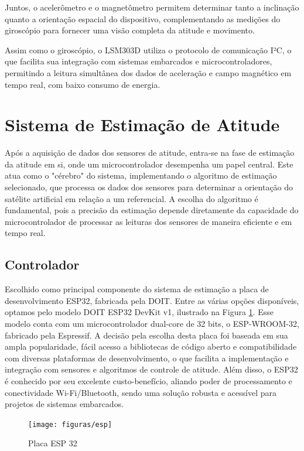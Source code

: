 \documentclass[
	12pt,				%
	openright,			%
	oneside,			%
	a4paper,			%
	english,			%
	brazil				%
	]{abntex2}
\begin{document}
Juntos, o acelerômetro e o magnetômetro permitem determinar tanto a inclinação quanto a orientação espacial do dispositivo, complementando as medições do giroscópio para fornecer uma visão completa da atitude e movimento.

Assim como o giroscópio, o LSM303D utiliza o protocolo de comunicação I²C, o que facilita sua integração com sistemas embarcados e microcontroladores, permitindo a leitura simultânea dos dados de aceleração e campo magnético em tempo real, com baixo consumo de energia.

\section{Sistema de Estimação de Atitude}

Após a aquisição de dados dos sensores de atitude, entra-se na fase de estimação da atitude em si, onde um microcontrolador desempenha um papel central. Este atua como o "cérebro" do sistema, implementando o algoritmo de estimação selecionado, que processa os dados dos sensores para determinar a orientação do satélite artificial em relação a um referencial. A escolha do algoritmo é fundamental, pois a precisão da estimação depende diretamente da capacidade do microcontrolador de processar as leituras dos sensores de maneira eficiente e em tempo real.

\subsection{Controlador}


Escolhido como principal componente do sistema de estimação a placa de desenvolvimento ESP32, fabricada pela DOIT. Entre as várias opções disponíveis, optamos pelo modelo DOIT ESP32 DevKit v1, ilustrado na Figura \ref{fig:esp}. Esse modelo conta com um microcontrolador dual-core de 32 bits, o ESP-WROOM-32, fabricado pela Espressif. A decisão pela escolha desta placa foi baseada em sua ampla popularidade, fácil acesso a bibliotecas de código aberto e compatibilidade com diversas plataformas de desenvolvimento, o que facilita a implementação e integração com sensores e algoritmos de controle de atitude. Além disso, o ESP32 é conhecido por seu excelente custo-benefício, aliando poder de processamento e conectividade Wi-Fi/Bluetooth, sendo uma solução robusta e acessível para projetos de sistemas embarcados.

\begin{figure}[h]
	\centering
	\texttt{[image: figuras/esp]}
	\caption[ESP32]{Placa ESP 32}
	\label{fig:esp}
\end{figure}
\end{document}

